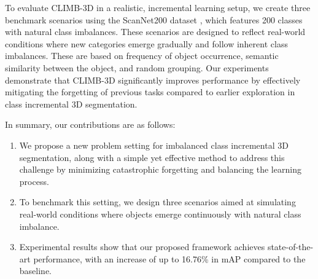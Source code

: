 To evaluate CLIMB-3D in a realistic, incremental learning setup, we create three benchmark scenarios using the ScanNet200 dataset \cite{rozenberszki2022language}, which features 200 classes with natural class imbalances. These scenarios are designed to reflect real-world conditions where new categories emerge gradually and follow inherent class imbalances. These are based on  frequency of object occurrence,  semantic similarity between the object, and  random grouping. 
Our experiments demonstrate that CLIMB-3D significantly improves performance by effectively mitigating the forgetting of previous tasks compared to earlier exploration in class incremental 3D segmentation.

In summary, our contributions are as follows:
\begin{enumerate}
\item We propose a new problem setting for imbalanced class incremental 3D segmentation, along with a simple yet effective method to address this challenge by minimizing catastrophic forgetting and balancing the learning process.
\item To benchmark this setting, we design three scenarios aimed at simulating real-world conditions where objects emerge continuously with natural class imbalance.
\item Experimental results show that our proposed framework achieves state-of-the-art performance, with an increase of up to 16.76\% in mAP compared to the baseline.
\end{enumerate}